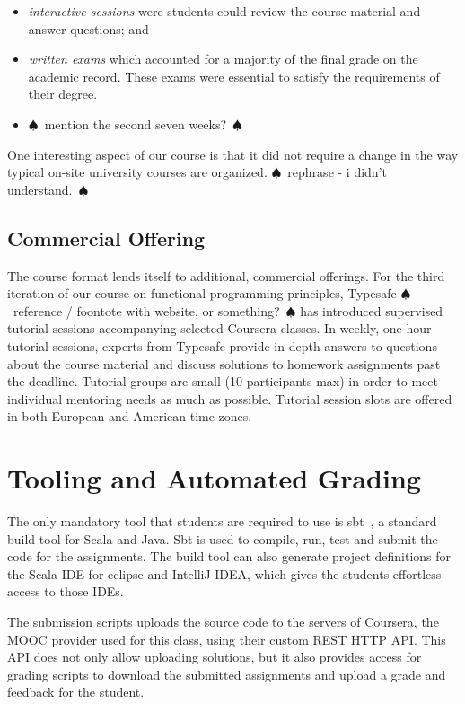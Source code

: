 \documentclass{sig-alternate}
\newcommand{\todo}[1]{$\spadesuit$~#1~$\spadesuit$}
\begin{document}
\begin{itemize}
\item {\em interactive sessions} were students could review the course material and
  answer questions; and
\item {\em written exams} which accounted for a majority of the final grade on the
  academic record. These exams were essential to satisfy the requirements of
  their degree.
\item \todo{mention the second seven weeks?}
\end{itemize}

One interesting aspect of our course is that it did not require a change in
the way typical on-site university courses are organized. \todo{rephrase - i didn't
understand.}

\subsection{Commercial Offering}

The course format lends itself to additional, commercial offerings. For the
third iteration of our course on functional programming principles, Typesafe
\todo{reference / foontote with website, or something?}
has introduced supervised tutorial sessions accompanying selected Coursera
classes. In weekly, one-hour tutorial sessions, experts from Typesafe provide
in-depth answers to questions about the course material and discuss solutions
to homework assignments past the deadline. Tutorial groups are small (10
participants max) in order to meet individual mentoring needs as much as
possible. Tutorial session slots are offered in both European and American
time zones.


\section{Tooling and Automated Grading}

The only mandatory tool that students are required to use is sbt~\cite{sbt}, a
standard build tool for Scala and Java. Sbt is used to compile, run, test and
submit the code for the assignments. The build tool can also generate project
definitions for the Scala IDE for eclipse and IntelliJ IDEA, which gives the
students effortless access to those IDEs.

The submission scripts uploads the source code to the servers of Coursera, the
MOOC provider used for this class, using their custom REST HTTP API. This API
does not only allow uploading solutions, but it also provides access for grading
scripts to download the submitted assignments and upload a grade and feedback
for the student.
\end{document}
